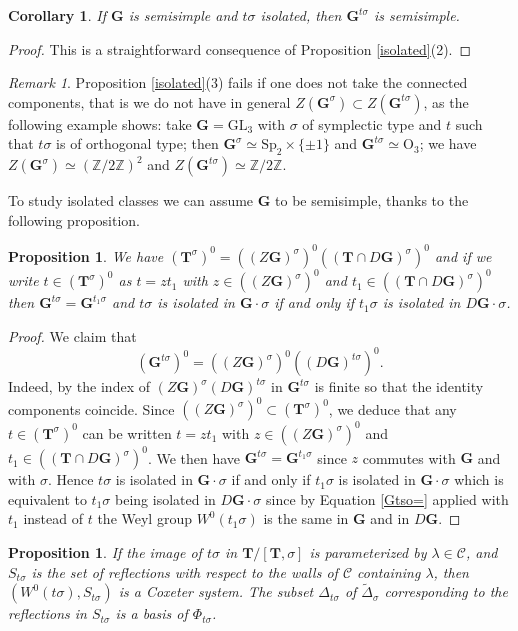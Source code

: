 \documentclass{amsart}
\newtheorem{proposition}[equation]{Proposition}
\newtheorem{corollary}[equation]{Corollary}
\numberwithin{equation}{section}
\theoremstyle{definition}
\theoremstyle{remark}
\newtheorem{remark}[equation]{Remark}
\newcommand\bG{{\mathbf G}}
\newcommand\bT{{\mathbf T}}
\newcommand\BZ{{\mathbb Z}}
\newcommand\CC{{\mathcal C}}
\newcommand\Gtso{{(\bG^{t\sigma})^0}}
\newcommand\Gts{{\bG^{t\sigma}}}
\newcommand\Gs{{\bG^\sigma}}
\newcommand\Tso{{(\bT^\sigma)^0}}
\newcommand\LT{{\bT/[\bT,\sigma]}}
\newcommand\GL{\mathrm{GL}}
\newcommand\Orth{\mathrm{O}}
\newcommand\Sp{\mathrm{Sp}}
\begin{document}
\begin{corollary}
If $\bG$ is semisimple and $t\sigma$ isolated, then $\Gts$ is semisimple.
\end{corollary}
\begin{proof}
This is a straightforward consequence of Proposition \ref{isolated}(2).
\end{proof}
\begin{remark} Proposition \ref{isolated}(3) fails if one does not take the
connected components, that is
we do not have in general $Z(\bG^\sigma)\subset Z(\Gts)$,
as the following example shows:
take $\bG=\GL_3$ with $\sigma$ of symplectic type and $t$ such that 
$t\sigma$ is of orthogonal type; then $\Gs\simeq \Sp_2\times\{\pm1\}$ and $\Gts\simeq\Orth_3$;
we have $Z(\Gs)\simeq(\BZ/2\BZ)^2$ and $Z(\Gts)\simeq\BZ/2\BZ$.
\end{remark}
To study isolated classes we can assume $\bG$ to be semisimple, thanks to the
following proposition.
\begin{proposition}
We have $\Tso=((Z\bG)^\sigma)^0((\bT\cap D\bG)^\sigma)^0$ and if we write
$t\in\Tso$ as $t=zt_1$ with $z\in((Z\bG)^\sigma)^0$
and $t_1\in((\bT\cap D\bG)^\sigma)^0$ then  $\bG^{t\sigma}=\bG^{t_1\sigma}$ and
$t\sigma$ is isolated in $\bG\cdot\sigma$ if and only if 
$t_1\sigma$ is isolated in $D\bG\cdot\sigma$.
\end{proposition}
\begin{proof}
We claim that \begin{equation}
\label{Gtso=}\Gtso=((Z\bG)^\sigma)^0((D\bG)^{t\sigma})^0 .
\end{equation}
Indeed, by 
\cite[1.31]{grnc} the index of
$(Z\bG)^\sigma(D\bG)^{t\sigma}$ in $\Gts$ is finite so that the identity components
coincide.
Since $((Z\bG)^\sigma)^0\subset \Tso$, we deduce  that any $t\in\Tso$ 
can be written $t=zt_1$
with $z\in((Z\bG)^\sigma)^0$ and $t_1\in((\bT\cap D\bG)^\sigma)^0$. We then have
$\bG^{t\sigma}=\bG^{t_1\sigma}$ since $z$ commutes with $\bG$ and with $\sigma$.
Hence $t\sigma$ is isolated in $\bG\cdot\sigma$ if and only if $t_1\sigma$ is isolated in 
$\bG\cdot\sigma$ which is equivalent to $t_1\sigma$ being isolated in
$D\bG\cdot\sigma$ since by 
Equation \ref{Gtso=} applied with $t_1$ instead of $t$ the Weyl group 
$W^0(t_1\sigma)$ is the same in $\bG$ and in $D\bG$.
\end{proof}
\begin{proposition} \label{Stsigma}
If the image of $t\sigma$ in $\LT$ is parameterized
by $\lambda\in\CC$, and $S_{t\sigma}$ is the set of reflections with respect
to the walls of $\CC$ containing $\lambda$, then $(W^0(t\sigma),S_{t\sigma})$
is a Coxeter system.
 The subset $\Delta_{t\sigma}$
of $\tilde\Delta_\sigma$ %
corresponding to the reflections in $S_{t\sigma}$
is a basis of $\Phi_{t\sigma}$.
\end{proposition}
\end{document}
